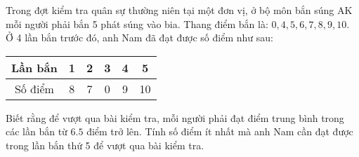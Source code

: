 \begin{vd}%
	Trong đợt kiểm tra quân sự thường niên tại một đơn vị, ở bộ môn bắn súng AK mỗi người phải bắn 5 phát súng vào bia. Thang điểm bắn là: $0, 4,5,6,7,8,9,10$. Ở 4 lần bắn trước đó, anh Nam đã đạt được số điểm như sau:
	\begin{center}
	\begin{tabular}{|c|c|c|c|c|c|}
			\hline
			Lần bắn & 1 & 2 & 3 & 4 & 5\\
			\hline
			Số điểm & 8 & 7 & 0 & 9 &10 \\
			\hline
	\end{tabular}
	\end{center}
	Biết rằng để vượt qua bài kiểm tra, mỗi người phải đạt điểm trung bình trong các lần bắn từ $6.5$ điểm trở lên. Tính số điểm ít nhất mà anh Nam cần đạt được trong lần bắn thứ 5 để vượt qua bài kiểm tra.
\end{vd}
